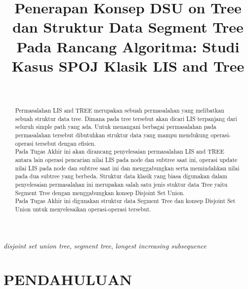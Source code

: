 \documentclass[a4paper]{IEEEtran}
\begin{document}
\title{Penerapan Konsep DSU on Tree dan Struktur Data Segment Tree Pada Rancang Algoritma: Studi Kasus SPOJ Klasik LIS and Tree}
\author{\\
}
\maketitle

\begin{abstract}
	 Permasalahan LIS and TREE merupakan sebuah permasalahan yang melibatkan sebuah struktur data tree. Dimana pada tree tersebut akan dicari LIS terpanjang dari seluruh simple path yang ada. Untuk menangani berbagai permasalahan pada permasalahan tersebut dibutuhkan struktur data yang mampu mendukung operasi-operasi tersebut dengan efisien.\\
	 Pada Tugas Akhir ini akan dirancang penyelesaian permasalahan LIS and TREE antara lain operasi pencarian nilai LIS pada node dan subtree saat ini, operasi update nilai LIS pada node dan subtree saat ini dan menggabungkan serta memindahkan nilai pada dua subtree yang berbeda. Struktur data klasik yang biasa digunakan dalam penyelesaian permasalahan ini merupakan salah satu jenis stuktur data Tree yaitu Segment Tree dengan menggabungkan konsep Disjoint Set Union.\\
	 Pada Tugas Akhir ini digunakan struktur data Segment Tree dan konsep Disjoint Set Union untuk menyelesaikan operasi-operasi tersebut.
\end{abstract}
\begin{IEEEkeywords}
	\textit{disjoint set union tree}, \textit{segment tree}, \textit{longest increasing subsequence}
\end{IEEEkeywords}

\section{PENDAHULUAN}
\end{document}

